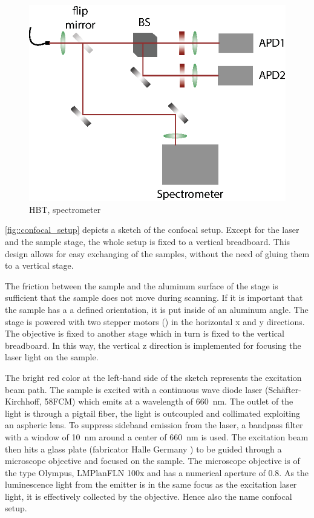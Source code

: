 	\begin{figure}[t] %
		\centering
		\includegraphics[width=\linewidth]{./pics/hbt_spectrometer.eps}
		\caption{HBT, spectrometer}
		\label{fig::hbt_spectrometer}
	\end{figure}

	\autoref{fig::confocal_setup} depicts a sketch of the confocal setup. 
	Except for the laser and the sample stage, the whole setup is fixed to a vertical breadboard. 
	This design allows for easy exchanging of the samples, without the need of gluing them to a vertical stage.

	The friction between the sample and the aluminum surface of the stage is sufficient that the sample does not move during scanning.
	If it is important that the sample has a a defined orientation, it is put inside of an aluminum angle.
	The stage is powered with two stepper motors () in the horizontal x and y directions.
	The objective is fixed to another stage which in turn is fixed to the vertical breadboard.
	In this way, the vertical z direction is implemented for focusing the laser light on the sample.

	The bright red color at the left-hand side of the sketch represents the excitation beam path.
	The sample is excited with a continuous wave diode laser (Sch\"after-Kirchhoff, 58FCM) which emits at a wavelength of \SI{660}{\nano\meter}.
	The outlet of the light is through a pigtail fiber, the light is outcoupled and collimated exploiting an aspheric lens.
	To suppress sideband emission from the laser, a bandpass filter with a window of  \SI{10}{\nm} around a center of \SI{660}{\nm} is used.
	The excitation beam then hits a glass plate (fabricator Halle Germany ) to be guided through a microscope objective and focused on the sample.
	The microscope objective is of the type Olympus, LMPlanFLN 100x and has a numerical aperture of 0.8.
	As the luminescence light from the emitter is in the same focus as the excitation laser light, it is effectively collected by the objective.
	Hence also the name confocal setup.

